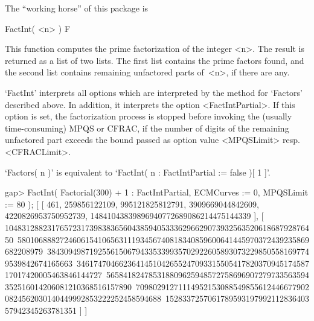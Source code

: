The ``working horse'' of this package is


\>FactInt( <n> ) F

This function computes the prime factorization of the integer <n>.
The result is returned as a list of two lists. The first list
contains the prime factors found, and the second list contains remaining 
unfactored parts of~<n>, if there are any.

`FactInt' interprets all options which are interpreted by the method
for `Factors' described above. In addition, it interprets the option
<FactIntPartial>. If this option is set, the factorization process is
stopped before invoking the (usually time-consuming) MPQS or CFRAC,
if the number of digits of the remaining unfactored part exceeds the
bound passed as option value <MPQSLimit> resp. <CFRACLimit>.

`Factors( n )' is equivalent to
`FactInt( n : FactIntPartial := false )[ 1 ]'.

\beginexample
gap> FactInt( Factorial(300) + 1 : FactIntPartial, ECMCurves := 0, MPQSLimit := 80 );
[ [ 461, 259856122109, 995121825812791, 3909669044842609, 4220826953750952739,
      14841043839896940772689086214475144339 ],
  [ 10483128823176572317398383656043859405333629662907393256352061868792876450\
580106888272460615410656311193456740818340859600641445970372439235869682208979\
384309498719255615067943353399357029226058930732298505581697749539842674165663\
346174704662364145104265524709331550541782037094517458717017420005463846144727\
565841824785318809625948572758696907279733563594352516014206081210368516157890\
709802912711149521530885498556124466779020824562030140449992853222252458594688\
152833725706178959319799211283640357942345263781351 ] ]
\endexample


